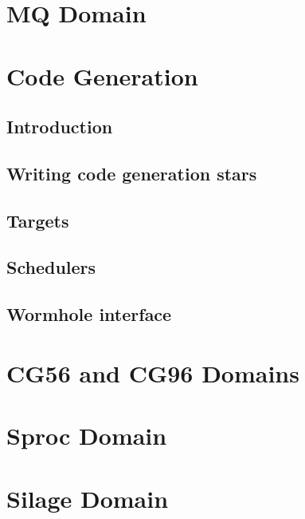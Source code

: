 \chapter{MQ Domain}
\label{MQ Domain}

\cleardoublepage
{}

\chapter{Code Generation}
\label{Code Generation}

\section{Introduction}
\label{CG Introduction}

\section{Writing code generation stars}
\label{Writing code generation stars}

\section{Targets}
\label{CG Targets}

\section{Schedulers}
\label{CG Schedulers}

\section{Wormhole interface}
\label{CG Wormhole interface}

\cleardoublepage
{}

\chapter{CG56 and CG96 Domains}
\label{CG56 and CG96 Domains}

\chapter{Sproc Domain}
\label{Sproc Domain}

\chapter{Silage Domain}
\label{Silage Domain}
